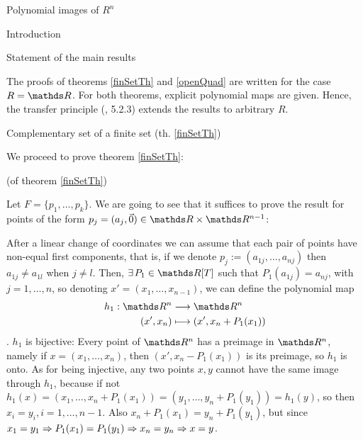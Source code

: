 \documentclass[11pt, a4paper, english, twoside, notitlepage]{report}
\begin{document}
\begin{chapter}{Polynomial images of $R^n$}
\begin{section}{Introduction}
\begin{subsection}{Statement of the main results}
\begin{Proof}
		\end{Proof}
	
		The proofs of theorems \ref{finSetTh} and \ref{openQuad} are written for the case $R = \R$. For both theorems, explicit polynomial maps are given. Hence, the transfer principle (\cite{bcr}, 5.2.3) extends the results to arbitrary $R$.
	
	\end{subsection}
	
\end{section}

\begin{section}{Complementary set of a finite set (th. \ref{finSetTh})}
	
	We proceed to prove theorem \ref{finSetTh}:
	
	\begin{Proof}(of theorem \ref{finSetTh})
		
		Let $F=\{p_1,\dots,p_k\}$. We are going to see that it suffices to prove the result for points of the form $p_j=(a_j,\vec{0})\in\R\times\R^{n-1}$:

		After a linear change of coordinates we can assume that each pair of points have non-equal first components, that is, if we denote $p_j:=(a_{1j},\dots,a_{nj})$ then $a_{1j}\neq a_{1l}$ when $j\neq l$. Then, $\exists P_1\in\R[T]$ such that $P_1(a_{1j})=a_{nj}$, with $j = 1,\dots, n$, so denoting $x'=(x_1,\dots,x_{n-1})$, we can define the polynomial map 
		\begin{align*}
			h_1: \R^n & \longrightarrow \R^n \\
			(x',x_n) & \longmapsto (x',x_n+P_1(x_1))
		\end{align*}
		. $h_1$ is bijective: Every point of $\R^n$ has a preimage in $\R^n$, namely if $x = (x_1, \dots, x_n)$, then $(x', x_n - P_1(x_1))$ is its preimage, so $h_1$ is onto. As for being injective, any two points $x, y$ cannot have the same image through $h_1$, because if not $h_1(x) = (x_1, \dots, x_n+ P_1(x_1)) = (y_1, \dots, y_n+ P_1(y_1)) = h_1(y)$, so then $x_i = y_i, i = 1, \dots, n-1$.  Also $x_n + P_1(x_1) = y_n + P_1(y_1)$, but since $x_1 = y_1 \Rightarrow P_1(x_1) = P_1(y_1) \Rightarrow x_n = y_n \Rightarrow x = y$.
		

\end{Proof}
\end{section}
\end{chapter}
\end{document}
